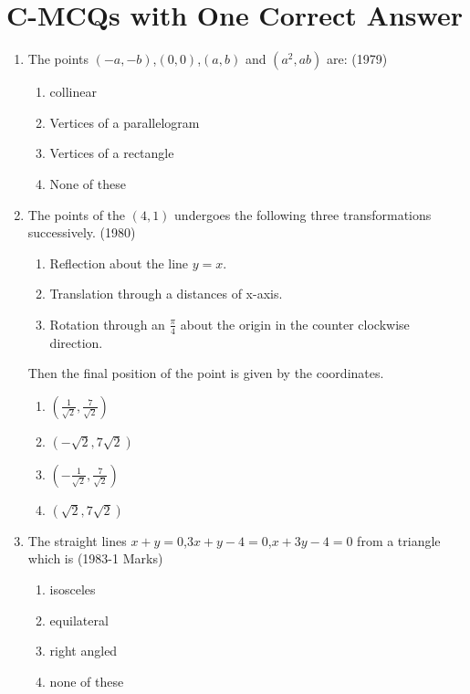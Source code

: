 \documentclass[journal,12pt,twocolumn]{IEEEtran}
\theoremstyle{remark}
\begin{document}
\section {C-MCQs with One Correct Answer}
\begin{enumerate}
    \item The points $(-a,-b)$,$(0,0)$,$(a,b)$ and $(a^2,ab)$ are:
    \hfill(1979)
    \begin{enumerate}
        \item collinear
        \item Vertices of a parallelogram
        \item Vertices of a rectangle 
        \item None of these
    \end{enumerate}
    \item The points of the $(4,1)$ undergoes the following three transformations successively.
    \hfill(1980)
    \begin{enumerate}
        \item Reflection about the line $y=x$.
        \item Translation through a distances of x-axis.
        \item Rotation through an $\frac{\pi}{4}$ about the origin in the counter clockwise direction.
    \end{enumerate}
    Then the final position of the point is given by the coordinates.
    \begin{multicols}{2} 		
    \begin{enumerate}
        \item $\left(\frac{1}{\sqrt{2}},\frac{7}{\sqrt{2}} \right)$
        \item $(-\sqrt{2},7\sqrt{2})$
        \item $\left(-\frac{1}{\sqrt{2}},\frac{7}{\sqrt{2}} \right)$
        \item $(\sqrt{2},7\sqrt{2})$
    \end{enumerate} 
    \end{multicols}	    
    \item The straight lines $x+y=0$,$3x+y-4=0$,$x+3y-4=0$ from a triangle which is 
    \hfill(1983-1 Marks)
    \begin{multicols}{2}	
    \begin{enumerate}
        \item isosceles
        \item equilateral 
        \item right angled
        \item none of these

\end{enumerate}
\end{multicols}
\end{enumerate}
\end{document}
